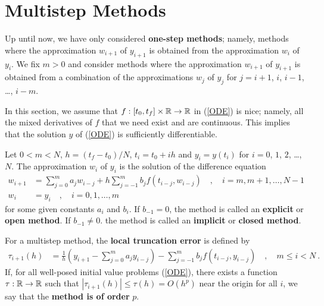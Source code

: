 \section{Multistep Methods}\label{SectMultMethod}

Up until now, we have only considered
{\bfseries one-step methods};
namely, methods where the approximation $w_{i+1}$ of $y_{i+1}$ is
obtained from the approximation $w_i$ of $y_i$.  We fix $m>0$ and
consider methods where the approximation $w_{i+1}$ of $y_{i+1}$ is
obtained from a combination of the approximations $w_j$ of $y_j$ for
$j=i+1$, $i$, $i-1$, \ldots, $i-m$.

In this section, we assume that $f:[t_0,t_f]\times \mathbb{R} \rightarrow \mathbb{R}$
in (\ref{ODE}) is nice; namely, all the mixed derivatives of $f$ that
we need exist and are continuous.  This implies that the solution $y$
of (\ref{ODE}) is sufficiently differentiable.

\begin{defn}
Let $0<m<N$, $h=(t_f-t_0)/N$, $t_i=t_0+ih$ and $y_i = y(t_i)$ for
$i=0$, $1$, $2$, \ldots, $N$.  The approximation $w_i$ of $y_i$ is the
solution of the difference equation
\begin{equation} \label{MULTISTEP}
\begin{split}
 w_{i+1} & = \sum_{j=0}^m a_j w_{i-j} + h
\sum_{j=-1}^m b_j f(t_{i-j},w_{i-j})
\quad, \quad i=m,m+1,\ldots,N-1 \\
w_i & = y_i \quad, \quad i=0,1,\ldots,m
\end{split}
\end{equation}
for some given constants $a_i$ and $b_i$.
If $b_{-1} = 0$, the method is called an
{\bfseries explicit} or
{\bfseries open method}.  If $b_{-1} \not=
0$. the method is called an
{\bfseries implicit} or
{\bfseries closed method}.
\label{GFMSM}
\end{defn}

\begin{defn}
For a multistep method, the
{\bfseries local truncation error} is defined by
\begin{align*}
\tau_{i+1}(h) &= \frac{1}{h}\left(y_{i+1} - \sum_{j=0}^ma_j y_{i-j} \right)
- \sum_{j=-1}^m b_j f(t_{i-j},y_{i-j}) \quad, \quad m \leq i < N \ .
\end{align*}
If, for all well-posed initial value problems (\ref{ODE}), there
exists a function $\tau:\mathbb{R}\to\mathbb{R}$ such that
$|\tau_{i+1}(h) | \leq \tau(h) = O(h^p)$ near the origin for all $i$,
we say that the
{\bfseries method is of order} $p$.
\label{local_trunc_error_def}
\end{defn}

